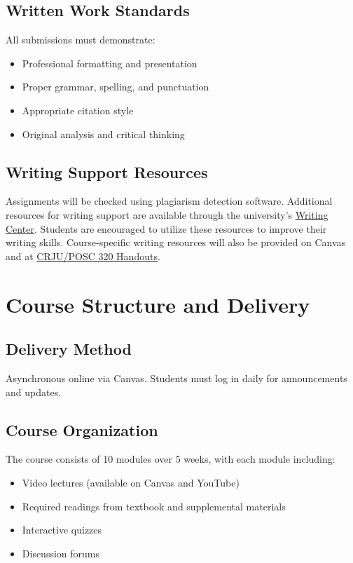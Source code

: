 \documentclass[11pt]{scrartcl} %
\begin{document}
\subsection{Written Work Standards}
All submissions must demonstrate:
\begin{itemize}
\item Professional formatting and presentation
\item Proper grammar, spelling, and punctuation
\item Appropriate citation style
\item Original analysis and critical thinking
\end{itemize}

\subsection{Writing Support Resources}
Assignments will be checked using plagiarism detection software. Additional resources for writing support are available through the university's \href{https://www.fullerton.edu/writingcenter/}{Writing Center}. Students are encouraged to utilize these resources to improve their writing skills. Course-specific writing resources will also be provided on Canvas and at \href{https://courses.dadams.io/POSC320/posc320_async_handouts.html}{CRJU/POSC 320 Handouts}.

\section{Course Structure and Delivery}

\subsection{Delivery Method}
Asynchronous online via Canvas. Students must log in daily for announcements and updates.

\subsection{Course Organization}
The course consists of 10 modules over 5 weeks, with each module including:
\begin{itemize}
\item Video lectures (available on Canvas and YouTube)
\item Required readings from textbook and supplemental materials
\item Interactive quizzes
\item Discussion forums
\end{itemize}
\end{document}
